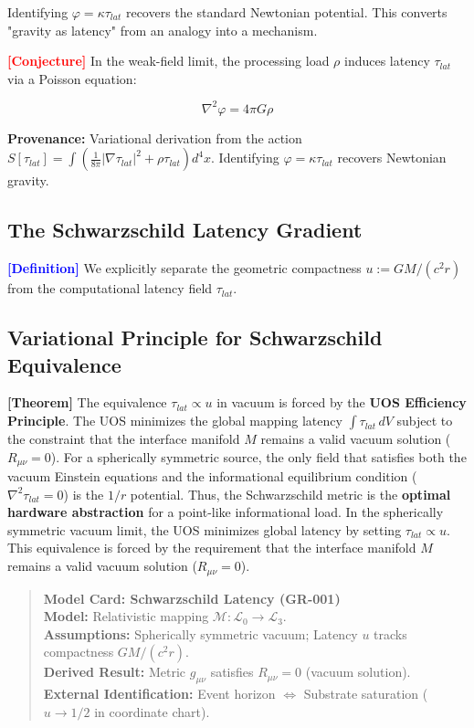 \documentclass[11pt,titlepage]{article}
\newcommand{\substrate}{\mathcal{L}_0}
\newcommand{\interface}{\mathcal{L}_3}
\newcommand{\tagdef}{\textcolor{blue}{\textbf{[Definition]}} }
\newcommand{\tagtheo}{\textcolor{green!60!black}{\textbf{[Theorem]}} }
\newcommand{\tagconj}{\textcolor{red}{\textbf{[Conjecture]}} }
\begin{document}
Identifying $\varphi = \kappa \tau_{lat}$ recovers the standard Newtonian potential. This converts "gravity as latency" from an analogy into a mechanism.

\tagconj In the weak-field limit, the processing load $\rho$ induces latency $\tau_{lat}$ via a Poisson equation:

\begin{equation}
\nabla^2 \varphi = 4\pi G \rho
\end{equation}

\textbf{Provenance:} Variational derivation from the action $S[\tau_{lat}] = \int (\frac{1}{8\pi}|\nabla\tau_{lat}|^2 + \rho\tau_{lat}) d^4x$. Identifying $\varphi = \kappa \tau_{lat}$ recovers Newtonian gravity.

\subsection{The Schwarzschild Latency Gradient}
\tagdef We explicitly separate the geometric compactness $u := GM/(c^2 r)$ from the computational latency field $\tau_{lat}$. 

\subsection{Variational Principle for Schwarzschild Equivalence}
\tagtheo The equivalence $\tau_{lat} \propto u$ in vacuum is forced by the \textbf{UOS Efficiency Principle}. The UOS minimizes the global mapping latency $\int \tau_{lat} \, dV$ subject to the constraint that the interface manifold $M$ remains a valid vacuum solution ($R_{\mu\nu}=0$). 
For a spherically symmetric source, the only field that satisfies both the vacuum Einstein equations and the informational equilibrium condition ($\nabla^2 \tau_{lat} = 0$) is the $1/r$ potential. Thus, the Schwarzschild metric is the \textbf{optimal hardware abstraction} for a point-like informational load.
 In the spherically symmetric vacuum limit, the UOS minimizes global latency by setting $\tau_{lat} \propto u$. This equivalence is forced by the requirement that the interface manifold $M$ remains a valid vacuum solution ($R_{\mu\nu}=0$).

\begin{quote}
\textbf{Model Card: Schwarzschild Latency (GR-001)} \\
\textbf{Model:} Relativistic mapping $\mathcal{M}: \substrate \to \interface$. \\
\textbf{Assumptions:} Spherically symmetric vacuum; Latency $u$ tracks compactness $GM/(c^2 r)$. \\
\textbf{Derived Result:} Metric $g_{\mu\nu}$ satisfies $R_{\mu\nu}=0$ (vacuum solution). \\
\textbf{External Identification:} Event horizon $\iff$ Substrate saturation ($u \to 1/2$ in coordinate chart).
\end{quote}
\end{document}
